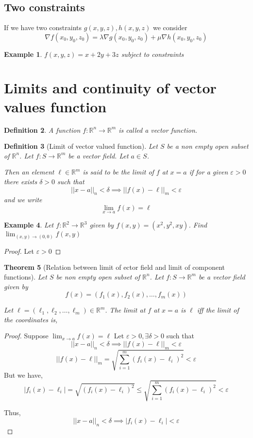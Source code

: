 \documentclass[oneside,11pt,pdftex]{book}%
\numberwithin{equation}{section}
\newtheorem{theorem}{Theorem}[chapter]%
\newtheorem{example}[theorem]{Example}
\newtheorem{definition}[theorem]{Definition}
\numberwithin{section}{chapter}
\numberwithin{equation}{chapter}
\newcommand{\R}{\mathbb{R}}
\begin{document}
\subsection{Two constraints}
If we have two constraints $ g(x,y,z), h(x,y,z) $ we consider \[ \nabla f(x_0,y_0,z_0)=\lambda \nabla g(x_0,y_0,z_0)+\mu \nabla h(x_0,y_0,z_0) \]

\begin{example}
	$ f(x,y,z)=x+2y+3z$ subject to constraints $  $
\end{example}

\section{Limits and continuity of vector values function}
\begin{definition}
	A function $ f:\R^n\rightarrow \R^m $ is called a vector function.
\end{definition}

\begin{definition}[Limit of vector valued function]
	Let $ S $ be a non empty open subset of $ \R^n $. Let $ f:S\rightarrow \R^m $ be a vector field. Let $ a \in S $.
	
	Then an element $ \ell \in \R^m $ is said to be the limit of $ f $ at $ x=a $ if for a given $ \varepsilon>0 $ there exists $ \delta>0 $ such that 
	\[ ||x-a||_n<\delta \implies ||f(x)-\ell||_m<\varepsilon\] and we write \[ \lim_{x\rightarrow a}f(x) = \ell \]
\end{definition}

\begin{example}
	Let $ f:\R^2 \rightarrow \R^3 $ given by $ f(x,y) = (x^2,y^2,xy)$. Find $ \lim_{(x,y)\rightarrow(0,0)} f(x,y) $
\end{example}
\begin{proof}
	Let $ \varepsilon>0 $
	
	
\end{proof}

\begin{theorem}[Relation between limit of ector field and limit of component functions]
	Let $ S $ be non empty open subset of $ \R^n $.
	Let $ f:S \rightarrow \R^m $ be a vector field given by \[ f(x) = (f_1(x),f_2(x),\dots,f_m(x))\]
	
	Let $ \ell=(\ell_1,\ell_2,\dots,\ell_m)\in \R^m $. The limit at $ f $ at $ x=a $ is $ \ell  $ iff the limit of the coordinates is,
\end{theorem}
\begin{proof}
	Suppose $ \lim_{x\rightarrow a} f(x)=\ell  $
	Let $ \varepsilon>0, \exists \delta>0 $ such that
	\[ ||x-a||_n<\delta \implies ||f(x)-\ell||_m<\varepsilon \]
	\[ ||f(x)-\ell||_m=\sqrt{\sum_{i=1}^m (f_i(x)-\ell_i)^2} < \varepsilon\]
	But we have,
	\[ |f_i(x)-\ell_i|=\sqrt{(f_i(x)-\ell_i)^2} \leq \sqrt{\sum_{i=1}^m(f_i(x)-\ell_i)^2}< \varepsilon\]
	
	Thus,
	\[ ||x-a||_n<\delta \implies |f_i(x)-\ell_i|<\varepsilon \]
\end{proof}
\end{document}

